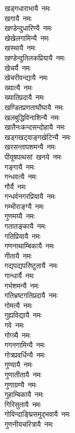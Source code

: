 \begin{multicols}{\maxColumns}
\begin{flushleft}
खड्गधाराभायै~नमः\\
खगायै~नमः\\
खण्डेन्दुधारिण्यै~नमः\hfill{}\\
खेखेलगामिन्यै~नमः\\
खस्थायै~नमः\\
खण्डेन्दुतिलकप्रियायै~नमः\\
खेचर्यै~नमः\\
खेचरीवन्द्यायै~नमः\\
ख्यात्यै~नमः\\
ख्यातिप्रदायै~नमः\\
खण्डितप्रणताघौघायै~नमः\\
खलबुद्धिविनाशिन्यै~नमः\\
खातैनःकन्दसन्दोहायै~नमः\hfill{}\\
खड्गखट्वाङ्गखेटिन्यै~नमः\\
खरसन्तापशमन्यै~नमः\\
पीयूषपाथसां~खनये~नमः\\
गङ्गायै~नमः\\
गन्धवत्यै~नमः\\
गौर्यै~नमः\\
गन्धर्वनगरप्रियायै~नमः\\
गम्भीराङ्ग्यै~नमः\\
गुणमय्यै~नमः\\
गतातङ्कायै~नमः\hfill{}\\
गतिप्रियायै~नमः\\
गणनाथाम्बिकायै~नमः\\
गीतायै~नमः\\
गद्यपद्यपरिष्टुतायै~नमः\\
गान्धार्यै~नमः\\
गर्भशमन्यै~नमः\\
गतिभ्रष्टगतिप्रदायै~नमः\\
गोमत्यै~नमः\\
गुह्यविद्यायै~नमः\\
गवे~नमः\hfill{}\\
गोप्त्र्यै~नमः\\
गगनगामिन्यै~नमः\\
गोत्रप्रवर्धिन्यै~नमः\\
गुण्यायै~नमः\\
गुणातीतायै~नमः\\
गुणाग्रण्यै~नमः\\
गुहाम्बिकायै~नमः\\
गिरिसुतायै~नमः\\
गोविन्दाङ्घ्रिसमुद्भवायै~नमः\\
गुणनीयचरित्रायै~नमः\hfill{}\\

\end{flushleft}
\end{multicols}
